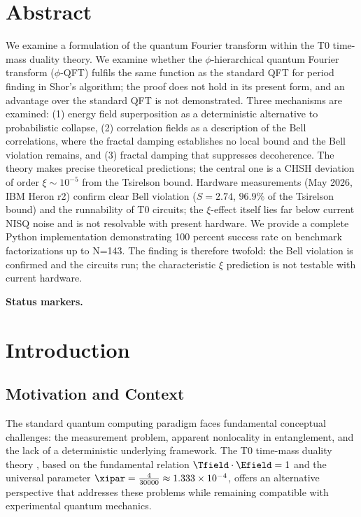 \section*{Abstract}

We examine a formulation of the quantum Fourier transform within the T0 time-mass duality theory. We examine whether the $\phi$-hierarchical quantum Fourier transform ($\phi$-QFT) fulfils the same function as the standard QFT for period finding in Shor's algorithm; the proof does not hold in its present form, and an advantage over the standard QFT is not demonstrated. Three mechanisms are examined: (1) energy field superposition as a deterministic alternative to probabilistic collapse, (2) correlation fields as a description of the Bell correlations, where the fractal damping establishes no local bound and the Bell violation remains, and (3) fractal damping that suppresses decoherence. The theory makes precise theoretical predictions; the central one is a CHSH deviation of order $\xi \sim 10^{-5}$ from the Tsirelson bound. Hardware measurements (May 2026, IBM Heron r2) confirm clear Bell violation ($S = 2.74$, $96.9\%$ of the Tsirelson bound) and the runnability of T0 circuits; the $\xi$-effect itself lies far below current NISQ noise and is not resolvable with present hardware. We provide a complete Python implementation demonstrating 100 percent success rate on benchmark factorizations up to N=143. The finding is therefore twofold: the Bell violation is confirmed and the circuits run; the characteristic $\xi$ prediction is not testable with current hardware.


\clearpage

\medskip\noindent\textbf{Status markers.}


\section{Introduction}

\subsection{Motivation and Context}

The standard quantum computing paradigm faces fundamental conceptual challenges: the measurement problem, apparent nonlocality in entanglement, and the lack of a deterministic underlying framework. The T0 time-mass duality theory \cite{pascher_t0_2025}, based on the fundamental relation $\Tfield \cdot \Efield = 1$ and the universal parameter $\xipar = \frac{4}{30000} \approx 1.333 \times 10^{-4}$, offers an alternative perspective that addresses these problems while remaining compatible with experimental quantum mechanics.

